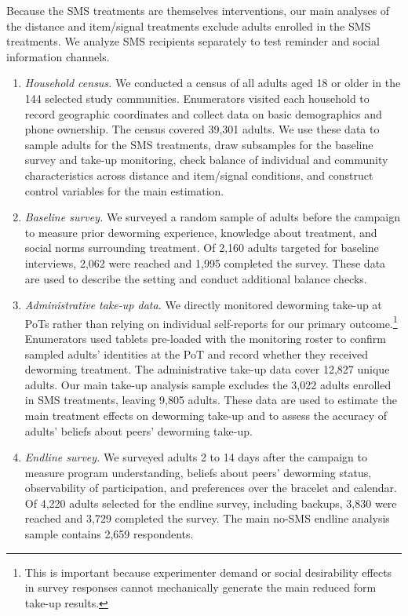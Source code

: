 \documentclass[ECM\space ReStud.tex]{subfiles}
\begin{document}
Because the SMS treatments are themselves interventions, our main analyses of the distance and item/signal treatments exclude adults enrolled in the SMS treatments. We analyze SMS recipients separately to test reminder and social information channels.

\begin{enumerate}
\item \emph{Household census.}
We conducted a census of all adults aged 18 or older in the 144 selected study communities. Enumerators visited each household to record geographic coordinates and collect data on basic demographics and phone ownership. The census covered 39{,}301 adults. We use these data to sample adults for the SMS treatments, draw subsamples for the baseline survey and take-up monitoring, check balance of individual and community characteristics across distance and item/signal conditions, and construct control variables for the main estimation.

\item \emph{Baseline survey.}
We surveyed a random sample of adults before the campaign to measure prior deworming experience, knowledge about treatment, and social norms surrounding treatment. Of 2{,}160 adults targeted for baseline interviews, 2{,}062 were reached and 1{,}995 completed the survey. These data are used to describe the setting and conduct additional balance checks.

\item \emph{Administrative take-up data.}
We directly monitored deworming take-up at PoTs rather than relying on individual self-reports for our primary outcome.\footnote{This is important because experimenter demand or social desirability effects in survey responses cannot mechanically generate the main reduced form take-up results.} Enumerators used tablets pre-loaded with the monitoring roster to confirm sampled adults' identities at the PoT and record whether they received deworming treatment. The administrative take-up data cover 12{,}827 unique adults. Our main take-up analysis sample excludes the 3{,}022 adults enrolled in SMS treatments, leaving 9{,}805 adults. These data are used to estimate the main treatment effects on deworming take-up and to assess the accuracy of adults' beliefs about peers' deworming take-up.

\item \emph{Endline survey.}
We surveyed adults 2 to 14 days after the campaign to measure program understanding, beliefs about peers' deworming status, observability of participation, and preferences over the bracelet and calendar. Of 4{,}220 adults selected for the endline survey, including backups, 3{,}830 were reached and 3{,}729 completed the survey. The main no-SMS endline analysis sample contains 2{,}659 respondents.


\end{enumerate}
\end{document}
